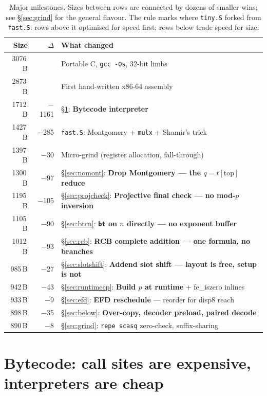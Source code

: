 \documentclass[11pt,a4paper]{article}
\begin{document}
\begin{table}[h]
\centering
\begin{tabular}{@{}rrl@{}}
\toprule
Size & $\Delta$ & What changed \\
\midrule
3076\,B &          & Portable C, \texttt{gcc -Os}, 32-bit limbs \\
2873\,B &          & First hand-written x86-64 assembly \\
1712\,B & $-$1161  & \S\ref{sec:bytecode}: \textbf{Bytecode interpreter} \\
1427\,B & $-$285   & \texttt{fast.S}: Montgomery + \texttt{mulx} + Shamir's trick \\
1397\,B & $-$30    & Micro-grind (register allocation, fall-through) \\
\midrule
1300\,B & $-$97    & \S\ref{sec:nomont}: \textbf{Drop Montgomery --- the $q=t[\text{top}]$ reduce} \\
1195\,B & $-$105   & \S\ref{sec:projcheck}: \textbf{Projective final check --- no mod-$p$ inversion} \\
1105\,B & $-$90    & \S\ref{sec:btcn}: \textbf{\texttt{bt} on $n$ directly --- no exponent buffer} \\
1012\,B & $-$93    & \S\ref{sec:rcb}: \textbf{RCB complete addition --- one formula, no branches} \\
 985\,B & $-$27    & \S\ref{sec:slotshift}: \textbf{Addend slot shift --- layout is free, setup is not} \\
 942\,B & $-$43    & \S\ref{sec:runtimecp}: \textbf{Build $p$ at runtime} + fe\_iszero inlines \\
 933\,B & $-$9     & \S\ref{sec:efd}: \textbf{EFD reschedule} --- reorder for disp8 reach \\
 898\,B & $-$35    & \S\ref{sec:below}: \textbf{Over-copy, decoder preload, paired decode} \\
 890\,B & $-$8     & \S\ref{sec:grind}: \texttt{repe scasq} zero-check, suffix-sharing \\
\bottomrule
\end{tabular}
\caption{Major milestones. Sizes between rows are connected by dozens
  of smaller wins; see \S\ref{sec:grind} for the general flavour. The
  rule marks where \texttt{tiny.S} forked from \texttt{fast.S}: rows
  above it optimised for speed first; rows below trade speed for
  size.}
\label{tab:journey}
\end{table}

\section{Bytecode: call sites are expensive, interpreters are cheap}
\label{sec:bytecode}
\end{document}
